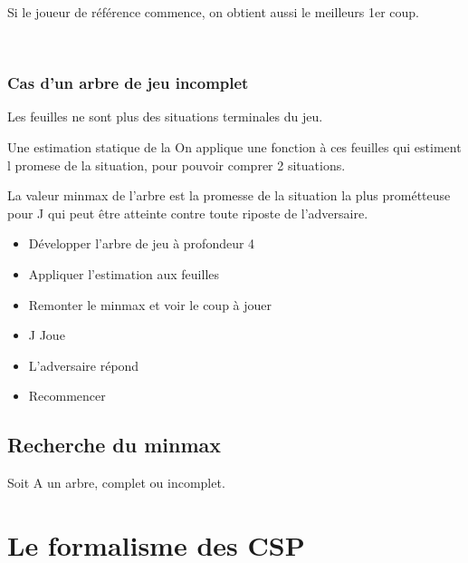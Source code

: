 \documentclass[12pt,a4paper,openany]{book}
\begin{document}
	\begin{remarque}
		Si le joueur de référence commence, on obtient aussi le meilleurs 1er coup.

~
	\end{remarque}
	
	\subsection{Cas d'un arbre de jeu incomplet}
	\begin{attention}
		Les feuilles ne sont plus des situations terminales du jeu.
	\end{attention}

	Une estimation statique de la On applique une fonction à ces feuilles qui estiment l promese de la situation, pour pouvoir comprer 2 situations.
	
	La valeur minmax de l'arbre est la promesse de la situation la plus prométteuse pour J qui peut être atteinte contre toute riposte de
	l'adversaire.
	
\begin{itemize}
	\item Développer l'arbre de jeu à profondeur 4
	\item Appliquer l'estimation aux feuilles
	\item Remonter le minmax et voir le coup à jouer
	\item J Joue
	\item L'adversaire répond
	\item Recommencer
\end{itemize}

\section{Recherche du minmax}
Soit A un arbre, complet ou incomplet.


	\chapter{Le formalisme des CSP}
\end{document}

